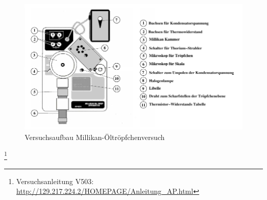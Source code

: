 \begin{figure}[h!]
	\centering
	\includegraphics[width=\textwidth]{Versuchsaufbau.png}
	\caption{Versuchsaufbau Millikan-Öltröpfchenversuch\footnotemark}
	\label{fig:versuchsaufbau}
\end{figure}
\footnote{Versuchsanleitung V503: \url{http://129.217.224.2/HOMEPAGE/Anleitung_AP.html}}